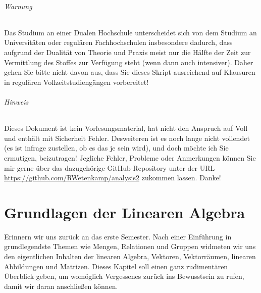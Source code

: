\documentclass[11pt,a4paper]{scrartcl}
\theoremstyle{remark}
\theoremstyle{definition}
\begin{document}
\paragraph{Warnung}
Das Studium an einer Dualen Hochschule unterscheidet sich von dem Studium an Universitäten oder regulären Fachhochschulen insbesondere dadurch, dass aufgrund der Dualität von Theorie und Praxis meist nur die Hälfte der Zeit zur Vermittlung des Stoffes zur Verfügung steht (wenn dann auch intensiver). Daher gehen Sie bitte nicht davon aus, dass Sie dieses Skript ausreichend auf Klausuren in regulären Vollzeitstudiengängen vorbereitet!
\paragraph{Hinweis}
Dieses Dokument ist kein Vorlesungsmaterial, hat nicht den Anspruch auf {Voll} und enthält mit Sicherheit Fehler. Desweiteren ist es noch lange nicht vollendet (es ist infrage zustellen, ob es das je sein wird), und doch möchte ich Sie ermutigen, beizutragen! Jegliche Fehler, Probleme oder Anmerkungen können Sie mir gerne über das dazugehörige GitHub-Repository unter der URL \url{https://github.com/RWetenkamp/analysis2} zukommen lassen. Danke!
\pagebreak
\part{Grundlagen der Linearen Algebra}
Erinnern wir uns zurück an das erste Semester. Nach einer Einführung in grundlegendste Themen wie Mengen, Relationen und Gruppen widmeten wir uns den eigentlichen Inhalten der linearen Algebra, Vektoren, Vektorräumen, linearen Abbildungen und Matrizen. Dieses Kapitel soll einen ganz rudimentären Überblick geben, um womöglich Vergessenes zurück ins Bewusstsein zu rufen, damit wir daran anschließen können.
\end{document}
